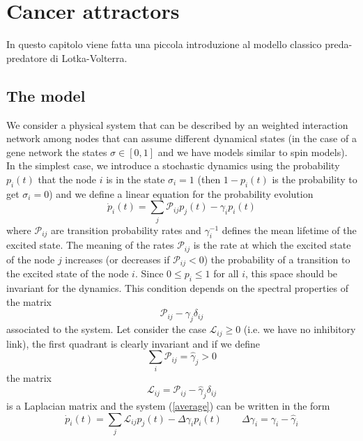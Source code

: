 \chapter{Cancer attractors}
\lhead[\fancyplain{}{\bfseries\thepage}]{\fancyplain{}{\bfseries\rightmark}}

\newenvironment{sistema}%
{\left\lbrace\begin{array}{@{}l@{}}}%
{\end{array}\right.}
In questo capitolo viene fatta una piccola introduzione al modello classico preda-predatore di Lotka-Volterra.
\section{The model}
We consider a physical system that can be described by an weighted interaction network among nodes that can assume different
dynamical states (in the case of a gene network the states $\sigma\in [0,1]$ and we have models similar to spin models).
In the simplest case, we introduce a stochastic dynamics using the probability $p_i(t)$ that the node $i$ is in the state $\sigma_i=1$
(then $1-p_i(t)$ is the probability to get $\sigma_i=0$) and we define a linear equation for the probability evolution
\begin{equation}
\dot p_i(t)=\sum_j \mathcal{P}_{ij}p_j(t)-\gamma_i p_i(t)
\label{average}
\end{equation}
where $\mathcal{P}_{ij}$ are transition probability rates and $\gamma_i^{-1}$ defines the mean lifetime of the excited state.
The meaning of the rates $\mathcal{P}_{ij}$ is the rate at which the excited state of the node $j$ increases (or decreases if
$\mathcal{P}_{ij}<0$) the probability of a transition to the excited state of the node $i$. Since $0\le p_i\le 1$ for all $i$, this space should be invariant for the dynamics. This condition depends on the spectral properties of the matrix
\begin{equation}
\mathcal{P}_{ij}-\gamma_j\delta_{ij}
\label{matrix}
\end{equation}
associated to the system. Let consider the case $\mathcal{L}_{ij}\ge 0$ (i.e. we have no inhibitory link),
the first quadrant is clearly invariant and if we define
$$
\sum_i  \mathcal{P}_{ij}=\hat \gamma_j>0
$$
the matrix 
$$
\mathcal{L}_{ij}=\mathcal{P}_{ij}-\hat \gamma_j \delta_{ij}
$$
is a Laplacian matrix and the system (\ref{average}) can be written in the form
$$
\dot p_i(t)=\sum_j \mathcal{L}_{ij}p_j(t)-\Delta \gamma_i p_i(t)\qquad \Delta \gamma_i=\gamma_i-\hat \gamma_i
$$
